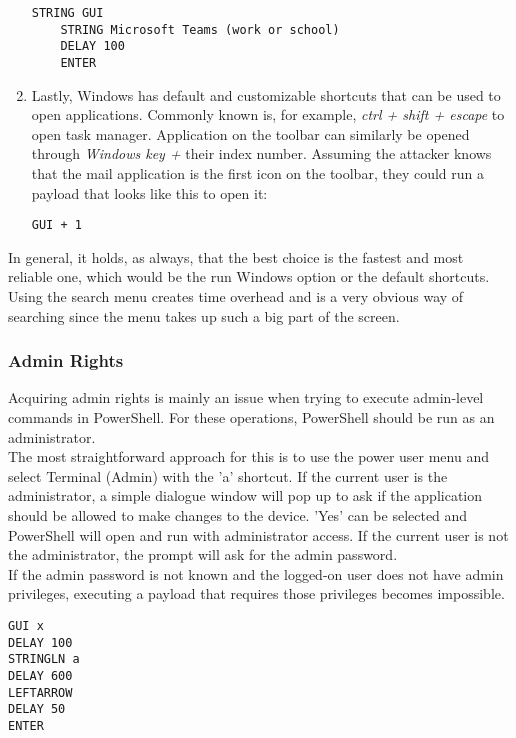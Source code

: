 \begin{enumerate}
\begin{lstlisting}[caption={Open Teams through Windows Run Menu}, captionpos=b]
    STRING GUI
    STRING Microsoft Teams (work or school)
    DELAY 100
    ENTER
    \end{lstlisting}
    \item Lastly, Windows has default and customizable shortcuts that can be used to open applications. Commonly known is, for example, \textit{ctrl + shift + escape} to open task manager. Application on the toolbar can similarly be opened through \textit{Windows key +} their index number. Assuming the attacker knows that the mail application is the first icon on the toolbar, they could run a payload that looks like this to open it:
    \begin{lstlisting}[caption={Open the first item on the toolbar}, captionpos=b]
    GUI + 1
    \end{lstlisting}
\end{enumerate}

In general, it holds, as always, that the best choice is the fastest and most reliable one, which would be the run Windows option or the default shortcuts. Using the search menu creates time overhead and is a very obvious way of searching since the menu takes up such a big part of the screen. 

\subsubsection{Admin Rights}

Acquiring admin rights is mainly an issue when trying to execute admin-level commands in PowerShell. For these operations, PowerShell should be run as an administrator. \\
The most straightforward approach for this is to use the power user menu and select Terminal (Admin) with the 'a' shortcut. If the current user is the administrator, a simple dialogue window will pop up to ask if the application should be allowed to make changes to the device. 'Yes' can be selected and PowerShell will open and run with administrator access. If the current user is not the administrator, the prompt will ask for the admin password. \\
If the admin password is not known and the logged-on user does not have admin privileges, executing a payload that requires those privileges becomes impossible. 
\begin{lstlisting}[caption={Open terminal with admin rights via the Power User Menu}, captionpos=b]
GUI x
DELAY 100
STRINGLN a
DELAY 600
LEFTARROW
DELAY 50
ENTER
\end{lstlisting}

